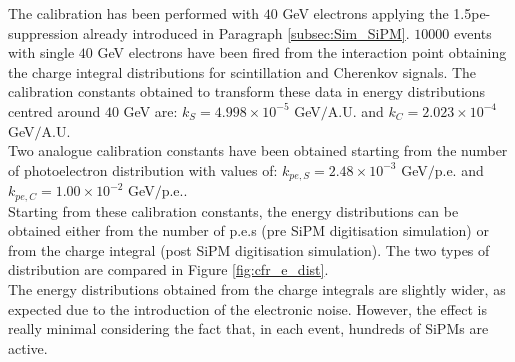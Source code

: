 The calibration has been performed with $40$ GeV electrons applying the 1.5pe-suppression already introduced in Paragraph \ref{subsec:Sim_SiPM}. $10000$ events with single $40$ GeV electrons have been fired from the interaction point obtaining the charge integral distributions for scintillation and Cherenkov signals.%
The calibration constants obtained to transform these data in energy distributions centred around $40$ GeV are: $k_S = 4.998 \times 10^{-5}$ GeV$/$A.U. and $k_C = 2.023 \times 10^{-4}$ GeV$/$A.U.\\
Two analogue calibration constants have been obtained starting from the number of photoelectron distribution with values of: $k_{pe,S} = 2.48 \times 10^{-3}$ GeV$/$p.e. and $k_{pe,C} = 1.00 \times 10^{-2}$ GeV$/$p.e..\\


Starting from these calibration constants, the energy distributions can be obtained either from the number of p.e.s (pre SiPM digitisation simulation) or from the charge integral (post SiPM digitisation simulation). The two types of distribution are compared in Figure \ref{fig:cfr_e_dist}.\\
The energy distributions obtained from the charge integrals are slightly wider, as expected due to the introduction of the electronic noise. However, the effect is really minimal considering the fact that, in each event, hundreds of SiPMs are active.\\

